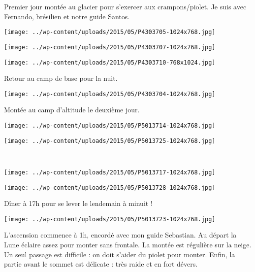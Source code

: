 Premier jour montée au glacier pour s'exercer aux crampons/piolet. Je suis avec Fernando, brésilien et notre guide Santos. 
\begin{center} \texttt{[image: ../wp-content/uploads/2015/05/P4303705-1024x768.jpg]} \end{center}
\begin{center} \texttt{[image: ../wp-content/uploads/2015/05/P4303707-1024x768.jpg]} \end{center}

\begin{center} \texttt{[image: ../wp-content/uploads/2015/05/P4303710-768x1024.jpg]} \end{center}

Retour au camp de base pour la nuit. 
\begin{center} \texttt{[image: ../wp-content/uploads/2015/05/P4303704-1024x768.jpg]} \end{center}
\vspace{-\topsep}
\pagebreak

Montée au camp d'altitude le deuxième jour. 
\begin{center} \texttt{[image: ../wp-content/uploads/2015/05/P5013714-1024x768.jpg]} \end{center}
\begin{center} \texttt{[image: ../wp-content/uploads/2015/05/P5013725-1024x768.jpg]} \end{center}
\vspace{-\topsep}
\vspace{-3.25mm}
\pagebreak
~
\begin{center} \texttt{[image: ../wp-content/uploads/2015/05/P5013717-1024x768.jpg]} \end{center}
\begin{center} \texttt{[image: ../wp-content/uploads/2015/05/P5013728-1024x768.jpg]} \end{center}
\vspace{-\topsep}
\vspace{-3.25mm}
\pagebreak

Dîner à 17h pour se lever le lendemain à minuit ! 
\begin{center} \texttt{[image: ../wp-content/uploads/2015/05/P5013723-1024x768.jpg]} \end{center}

L'ascension commence à 1h, encordé avec mon guide Sebastian. Au départ la Lune éclaire assez pour monter sans frontale. La montée est régulière sur la neige. Un seul passage est difficile : on doit s'aider du piolet pour monter. Enfin, la partie avant le sommet est délicate : très raide et en fort dévers. 

